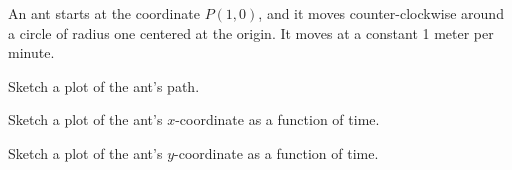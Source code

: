
\begin{problem}
\item An ant starts at the coordinate $P(1,0)$, and it moves
  counter-clockwise around a circle of radius one centered at the
  origin. It moves at a constant 1 meter per minute.
  \begin{subproblem}
  \item Sketch a plot of the ant's path.
    \vfill
  \item Sketch a plot of the ant's $x$-coordinate as a function of
    time. 
    \vfill
  \item Sketch a plot of the ant's $y$-coordinate as a function of
    time.
    \vfill
  \end{subproblem}
\end{problem}


